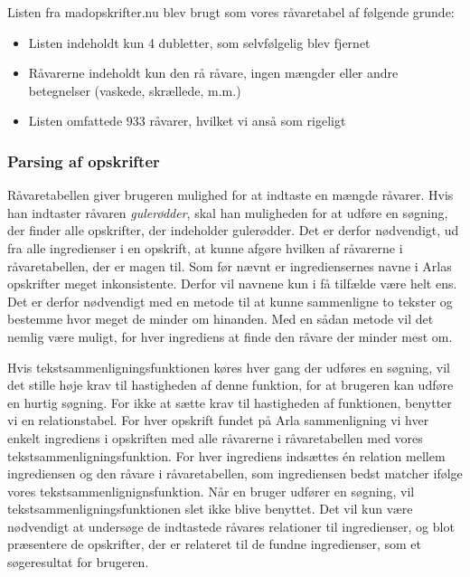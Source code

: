 Listen fra madopskrifter.nu blev brugt som vores råvaretabel af følgende grunde:

\begin{itemize}
\item Listen indeholdt kun 4 dubletter, som selvfølgelig blev fjernet
\item Råvarerne indeholdt kun den rå råvare, ingen mængder eller andre betegnelser (vaskede, skrællede, m.m.)
\item Listen omfattede 933 råvarer, hvilket vi anså som rigeligt
\end{itemize}

\subsubsection{Parsing af opskrifter}
Råvaretabellen giver brugeren mulighed for at indtaste en mængde råvarer. Hvis han indtaster råvaren \textit{gulerødder}, skal han muligheden for at udføre en søgning, der finder alle opskrifter, der indeholder gulerødder. Det er derfor nødvendigt, ud fra alle ingredienser i en opskrift, at kunne afgøre hvilken af råvarerne i råvaretabellen, der er magen til. Som før nævnt er ingrediensernes navne i Arlas opskrifter meget inkonsistente. Derfor vil navnene kun i få tilfælde være helt ens. Det er derfor nødvendigt med en metode til at kunne sammenligne to tekster og bestemme hvor meget de minder om hinanden. Med en sådan metode vil det nemlig være muligt, for hver ingrediens at finde den råvare der minder mest om.

Hvis tekstsammenligningsfunktionen køres hver gang der udføres en søgning, vil det stille høje krav til hastigheden af denne funktion, for at brugeren kan udføre en hurtig søgning. For ikke at sætte krav til hastigheden af funktionen, benytter vi en relationstabel. For hver opskrift fundet på Arla sammenligning vi hver enkelt ingrediens i opskriften med alle råvarerne i råvaretabellen med vores tekstsammenligningsfunktion. For hver ingrediens indsættes én relation mellem ingrediensen og den råvare i råvaretabellen, som ingrediensen bedst matcher ifølge vores tekstsammenlignignsfunktion. Når en bruger udfører en søgning, vil tekstsammenligningsfunktionen slet ikke blive benyttet. Det vil kun være nødvendigt at undersøge de indtastede råvares relationer til ingredienser, og blot præsentere de opskrifter, der er relateret til de fundne ingredienser, som et søgeresultat for brugeren.


